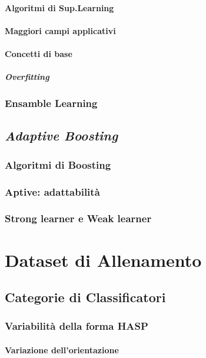                 \paragraph{Algoritmi di Sup.Learning}
                \paragraph{Maggiori campi applicativi}
                \paragraph{Concetti di base}
                    \subparagraph{Overfitting}
            \subsubsection{Ensamble Learning}
        \subsection{\emph{Adaptive Boosting}}
        \label{sub:adaptive_boosting}
            \subsubsection{Algoritmi di Boosting}
            \subsubsection{Aptive: adattabilità}
            \subsubsection{Strong learner e Weak learner}
    \section{Dataset di Allenamento}
    \label{sec:training_dataset}
        \subsection{Categorie di Classificatori}
        \label{sub:classifiers_categories}
            \subsubsection{Variabilità della forma HASP}
                \paragraph{Variazione dell'orientazione}
